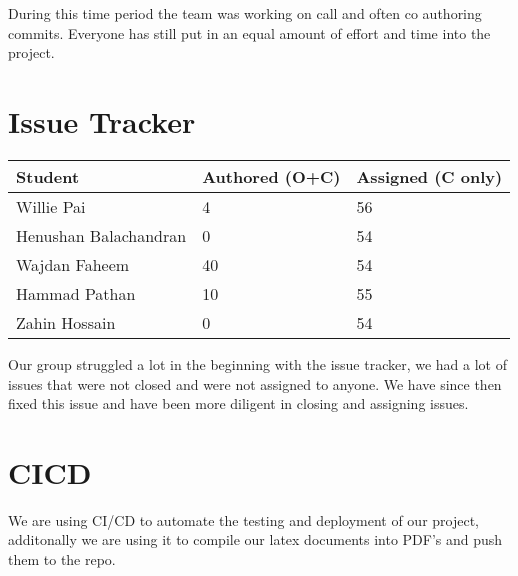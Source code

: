 \documentclass{article}
\begin{document}

During this time period the team was working on call and often co authoring commits. Everyone has still put in an equal amount of effort and time into the project.

\section{Issue Tracker}


\begin{table}[H]
\centering
\begin{tabular}{lll}
\toprule
\textbf{Student} & \textbf{Authored (O+C)} & \textbf{Assigned (C only)}\\
\midrule
Willie Pai & 4 & 56 \\
Henushan Balachandran & 0 & 54 \\
Wajdan Faheem & 40 & 54 \\
Hammad Pathan & 10 & 55 \\
Zahin Hossain & 0 & 54 \\
\bottomrule
\end{tabular}
\end{table}

Our group struggled a lot in the beginning with the issue tracker, we had a lot of issues that were not closed and were not assigned to anyone. We have since then fixed this issue and have been more diligent in closing and assigning issues.

\section{CICD}

We are using CI/CD to automate the testing and deployment of our project, additonally we are using it to compile our latex documents into PDF's and push them to the repo.
\end{document}
